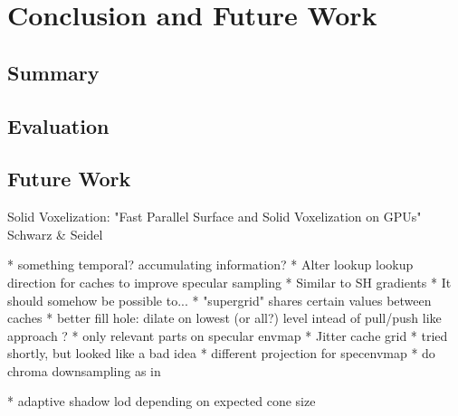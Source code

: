 \documentclass[thesis.tex]{subfiles}
\begin{document}
\chapter{Conclusion and Future Work}\label{chap:concl}

\section{Summary}


\section{Evaluation}


\section{Future Work}

Solid Voxelization: "Fast Parallel Surface and Solid Voxelization on GPUs"  Schwarz \& Seidel 


* something temporal? accumulating information?
* Alter lookup lookup direction for caches to improve specular sampling
  * Similar to SH gradients
  * It should somehow be possible to...
* "supergrid" shares certain values between caches
* better fill hole: dilate on lowest (or all?) level intead of pull/push like approach ?
* only relevant parts on specular envmap
* Jitter cache grid
  * tried shortly, but looked like a bad idea
* different projection for specenvmap
* do chroma downsampling as in \cite{bib:radiancecachechromaticcompression}

* adaptive shadow lod depending on expected cone size

\subfilebib %
\end{document}
